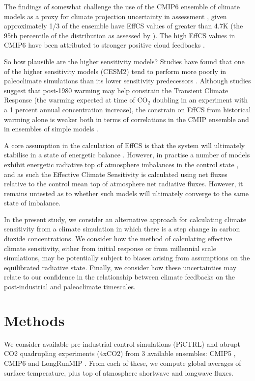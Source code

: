 \documentclass[esd, article]{copernicus}
\begin{document}
The findings of \cite{sherwood2020assessment} somewhat challenge the use of the CMIP6 ensemble of climate models \citep{eyring2016overview} as a proxy for climate projection uncertainty in assessment \citep{o2016scenario}, given approximately 1/3 of the ensemble \citep{meehl2020context} have EffCS values of greater than  4.7K (the 95th percentile of the distribution as assessed by \cite{sherwood2014spread}).  The high EffCS values in CMIP6 have been attributed to stronger positive cloud feedbacks \cite{zelinka2020causes}.  

So how plausible are the higher sensitivity models?  Studies have found that one of the higher sensitivity models (CESM2) tend to perform more poorly in paleoclimate simulations than its lower sensitivity predecessors \citep{zhu2020high}.  Although studies \citep{nijsse2020emergent,tokarska2020past} suggest that post-1980 warming may help constrain the Transient Climate Response (the warming expected at time of CO$_2$ doubling in an experiment with a 1 percent annual concentration increase), the constrain on EffCS from historical warming alone is weaker both in terms of correlations in the CMIP ensemble \cite{tokarska2018cumulative} and in ensembles of simple models \cite{sanderson2020relating,sherwood2020assessment}.

A core assumption in the calculation of EffCS is that the system will ultimately stabilise in a state of energetic balance \cite{gregory2004new}.  However, in practise a number of models exhibit energetic radiative top of atmosphere imbalances in the control state \cite{rugenstein2019longrunmip}, and as such the Effective Climate Sensitivity is calculated using net fluxes relative to the control mean top of atmosphere net radiative fluxes.  However, it remains untested as to whether such models will ultimately converge to the same state of imbalance.

In the present study, we consider an alternative approach for calculating climate sensitivity from a climate simulation in which there is a step change in carbon dioxide concentrations.  We consider how the method of calculating effective climate sensitivity, either from initial response or from millennial scale simulations, may be potentially subject to biases arising from assumptions on the equilibrated radiative state.  Finally, we consider how these uncertainties may relate to our confidence in the relationship between climate feedbacks on the post-industrial and paleoclimate timescales.

\section{Methods}
We consider available pre-industrial control simulations (PiCTRL) and abrupt CO2 quadrupling experiments (4xCO2) from 3 available ensembles: CMIP5 \citep{taylor2012overview}, CMIP6 \citep{eyring2016overview} and LongRunMIP \cite{rugenstein2019longrunmip}.  From each of these, we compute global averages of surface temperature, plus top of atmosphere shortwave and longwave fluxes.
\end{document}
